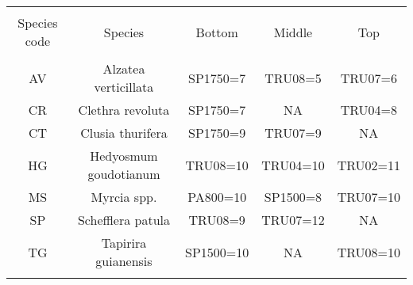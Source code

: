 
\begin{table}[!htbp] \centering 
  \caption{} 
  \label{species_elevcode_tally} 
\begin{tabular}{@{\extracolsep{5pt}} ccccc} 
\\[-1.8ex]\hline 
\hline \\[-1.8ex] 
Species code & Species & Bottom & Middle & Top \\ 
\hline \\[-1.8ex] 
AV & Alzatea verticillata & SP1750=7 & TRU08=5 & TRU07=6 \\ 
CR & Clethra revoluta & SP1750=7 & NA & TRU04=8 \\ 
CT & Clusia thurifera & SP1750=9 & TRU07=9 & NA \\ 
HG & Hedyosmum goudotianum & TRU08=10 & TRU04=10 & TRU02=11 \\ 
MS & Myrcia spp. & PA800=10 & SP1500=8 & TRU07=10 \\ 
SP & Schefflera patula & TRU08=9 & TRU07=12 & NA \\ 
TG & Tapirira guianensis & SP1500=10 & NA & TRU08=10 \\ 
\hline \\[-1.8ex] 
\end{tabular} 
\end{table} 
